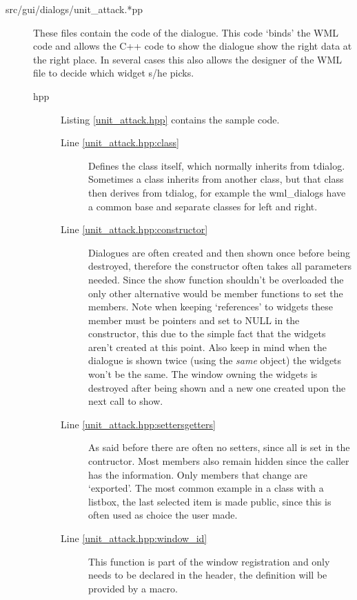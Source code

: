 \begin{description}

\item[src/gui/dialogs/unit\_attack.*pp]
	These files contain the code of the dialogue. This code `binds' the WML
	code and allows the C++ code to show the dialogue show the right data at the
	right place. In several cases this also allows the designer of the WML file
	to decide which widget s/he picks.

\begin{description}
\item[hpp] Listing \ref{unit_attack.hpp} contains the sample code. 
	\begin{description}
	\item[Line \ref{unit_attack.hpp:class}]
		Defines the class itself, which normally inherits from tdialog.
		Sometimes a class inherits from another class, but that class then
derives from tdialog, for example the wml\_dialogs have a common base and
separate classes for left and right.

	\item[Line \ref{unit_attack.hpp:constructor}]
		Dialogues are often created and then shown once before being destroyed,
therefore the constructor often takes all parameters needed. Since the show
function shouldn't be overloaded the only other alternative would be member
functions to set the members. Note when keeping `references' to widgets these
member must be pointers and set to NULL in the constructor, this due to the
simple fact that the widgets aren't created at this point. Also keep in mind
when
the dialogue is shown twice (using the \emph{same} object) the widgets won't be
the same. The window owning the widgets is destroyed after being shown and
a new one created upon the next call to show.

	\item[Line \ref{unit_attack.hpp:settersgetters}]
		As said before there are often no setters, since all is set in the
contructor. Most members also remain hidden since the caller has the
information. Only members that change are `exported'. The most common example in
a class with a listbox, the last selected item is made public, since this is
often used as choice the user made.

	\item[Line \ref{unit_attack.hpp:window_id}]
		This function is part of the window registration and only needs to be
declared in the header, the definition will be provided by a macro.


\end{description}
\end{description}
\end{description}
